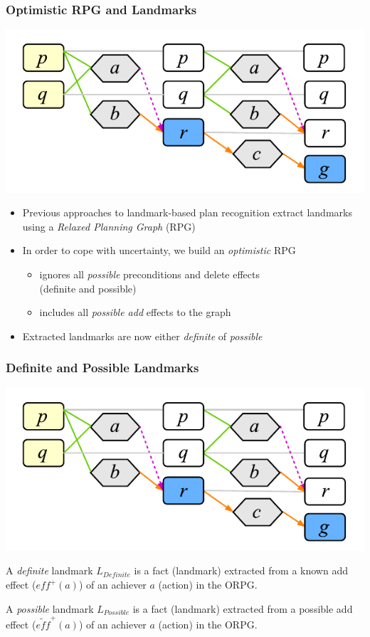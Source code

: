 \documentclass{beamer}
\begin{document}
\begin{frame}[c]\frametitle{Optimistic RPG and Landmarks}
	\begin{center}
		\includegraphics[width=.55\textwidth]{fig/ORPG-Example.pdf}
	\end{center}
	\begin{itemize}
		\item Previous approaches to landmark-based plan recognition extract landmarks using a \emph{Relaxed Planning Graph} (RPG)
		\item In order to cope with uncertainty, we build an \emph{optimistic} RPG
		\begin{itemize}
			\item ignores all \emph{possible} preconditions and delete effects \\ (definite and possible)
			\item includes all \emph{possible add} effects to the graph
		\end{itemize}
		\item Extracted landmarks are now either \emph{definite} of \emph{possible}
	\end{itemize}
\end{frame}

\begin{frame}[c]\frametitle{Definite and Possible Landmarks}
	\begin{center}
		\vspace{-2em}
		\includegraphics[width=.55\textwidth]{fig/ORPG-Example.pdf}
	\end{center}
	\vspace{-1.5em}
	\begin{definition}\label{def:DefiniteLandmark}
	A \textit{definite} landmark $L_{Definite}$ is a fact (landmark) extracted from a known add effect ($\mathit{eff}^{+}(a)$) of an achiever $a$ (action) in the ORPG.
	\end{definition}
	\begin{definition}\label{def:PossibleLandmark}
	A \textit{possible} landmark $L_{Possible}$ is a fact (landmark) extracted from a possible add effect ($\widetilde{\mathit{eff}}^{+}(a)$) of an achiever $a$ (action) in the ORPG.
	\end{definition}
	
\end{frame}
\end{document}
